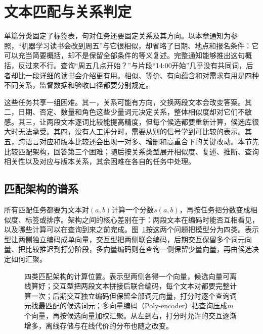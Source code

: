 \section{文本匹配与关系判定}
\label{sec:nlp-classification-matching}

单篇分类固定了标签表，句对任务还要固定关系及其方向。以本章通知为参照，“机器学习读书会改到周五”与它很相似，却省略了日期、地点和报名条件：它可以充当简要概括，却不是保留全部条件的等义复述。完整通知能够推出这句概括，反过来不行。查询“周五几点开始？”与片段“14:00开始”几乎没有共同词，后者却比一段详细的读书会介绍更有用。相似、等价、有向蕴含和对需求有用是四种不同关系，监督数据和验收口径都要分别规定。

这些任务共享一组困难。其一，关系可能有方向，交换两段文本会改变答案。其二，日期、否定、数量和角色这些少量词元决定关系，整体相似度却对它们不敏感。其三，让两段文本逐词比较能提高精度，但每个候选都要重新计算，候选库很大时无法承受。其四，没有人工评分时，需要从别的信号学到可比较的表示。其五，跨语言对应和版本比较还会出现一对多、增删和高重合下的关键改动。本节先比较匹配架构，回答第三个困难；随后按关系类型展开相似度、复述、推断、查询相关性以及对应与版本关系，其余困难在各自的任务中处理。

\subsection{匹配架构的谱系}
\label{sec:nlp-classification-matching-architectures}

所有匹配任务都要为文本对$(a,b)$计算一个分数$s(a,b)$，再按任务把分数变成相似度、标签或排序。架构之间的核心差别在于：两段文本在编码时能否互相看见，以及哪些计算可以在查询到来之前完成。图~\ref{fig:nlp-classification-matching-architectures}按这两个问题把模型分为四类。表示型让两侧独立编码成单向量，交互型把两侧联合编码，后期交互保留多个词元向量、把比较推迟到打分阶段，多向量编码则在查询一侧保留少量向量，再由候选决定如何汇聚。

\begin{figure}[htbp]
  \centering
  
  \caption{四类匹配架构的计算位置。表示型两侧各得一个向量，候选向量可离线算好；交互型把两段文本拼接后联合编码，每个文本对都要完整计算一次；后期交互独立编码但保留全部词元向量，打分时逐个查询词元找最匹配的候选词元；多向量编码（Poly-encoder）把查询压成$m$个向量，再按候选向量加权汇聚。从左到右，打分时允许的交互逐渐增多，离线存储与在线代价的分布也随之改变。}
  \label{fig:nlp-classification-matching-architectures}
\end{figure}


